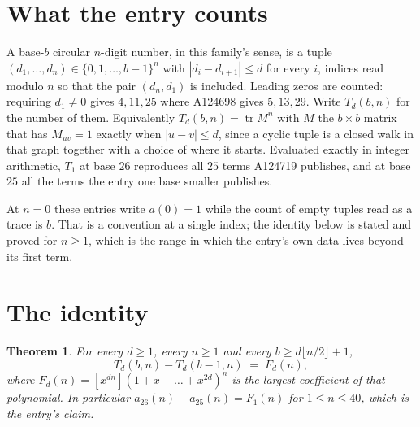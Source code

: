 \documentclass[11pt,a4paper]{article}
\theoremstyle{plain}
\newtheorem{theorem}{Theorem}
\theoremstyle{definition}
\begin{document}
\section{What the entry counts}

A base-$b$ circular $n$-digit number, in this family's sense, is a tuple
$(d_1,\dots,d_n)\in\{0,1,\dots,b-1\}^{n}$ with $|d_i-d_{i+1}|\le d$ for every $i$, indices
read modulo $n$ so that the pair $(d_n,d_1)$ is included. Leading zeros are counted: requiring
$d_1\ne0$ gives $4,11,25$ where A124698 gives $5,13,29$. Write $T_d(b,n)$ for the number of
them. Equivalently $T_d(b,n)=\operatorname{tr}M^{n}$ with $M$ the $b\times b$ matrix that has
$M_{uv}=1$ exactly when $|u-v|\le d$, since a cyclic tuple is a closed walk in that graph
together with a choice of where it starts. Evaluated exactly in integer arithmetic, $T_{1}$
at base $26$ reproduces all $25$ terms A124719 publishes, and at base $25$ all the
terms the entry one base smaller publishes.

At $n=0$ these entries write $a(0)=1$ while the count of empty tuples read as a trace is $b$.
That is a convention at a single index; the identity below is stated and proved for $n\ge1$,
which is the range in which the entry's own data lives beyond its first term.

\section{The identity}

\begin{theorem}
For every $d\ge1$, every $n\ge1$ and every $b\ge d\lfloor n/2\rfloor+1$,
\[
T_d(b,n)-T_d(b-1,n)\;=\;F_d(n),
\]
where $F_d(n)=[x^{dn}](1+x+\dots+x^{2d})^{n}$ is the largest coefficient of that
polynomial. In particular $a_{26}(n)-a_{25}(n)=F_{1}(n)$ for $1\le n\le40$, which
is the entry's claim.
\end{theorem}
\end{document}
